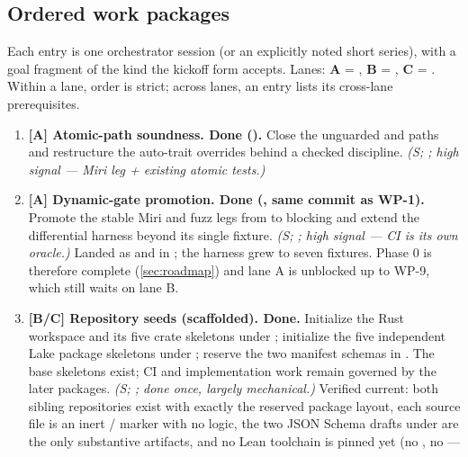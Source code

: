 \subsection{Ordered work packages}
\label{sec:decomposition-wps}

Each entry is one orchestrator session (or an explicitly noted short
series), with a goal fragment of the kind the kickoff form accepts.
Lanes: \textbf{A} = \dotnetrs{}, \textbf{B} =
, \textbf{C} =
. Within a lane, order is
strict; across lanes, an entry lists its cross-lane prerequisites.

\begin{enumerate}[leftmargin=2.2em, itemsep=0.35em]
\item \textbf{[A] Atomic-path soundness. \textbf{Done}
  ().} Close the unguarded
   and  paths and
  restructure the  auto-trait overrides
  behind a checked discipline.
  \emph{(S; ; high signal --- Miri leg + existing atomic
  tests.)}
\item \textbf{[A] Dynamic-gate promotion. \textbf{Done}
  (, same commit as WP-1).} Promote the stable Miri and
  fuzz legs from  to blocking and extend the
  differential harness beyond its single fixture.
  \emph{(S; ; high signal --- CI is its own oracle.)}
  Landed as  and  in
  ; the harness grew to seven fixtures. Phase 0 is
  therefore complete (\cref{sec:roadmap}) and lane A is unblocked up
  to WP-9, which still waits on lane B.
\item \textbf{[B/C] Repository seeds (scaffolded). \textbf{Done.}}
  Initialize the
   Rust workspace and its five crate skeletons under
  ; initialize the five independent Lake package
  skeletons under ; reserve the two
  manifest schemas in .  The base skeletons
  exist; CI and implementation work remain governed by the later
  packages.
  \emph{(S; ; done once, largely mechanical.)}
  Verified current: both sibling repositories exist with exactly the
  reserved package layout, each source file is an inert
  / marker with no logic, the
  two JSON Schema drafts under  are the only
  substantive artifacts, and no Lean toolchain is pinned yet (no
  , no  ---

\end{enumerate}
